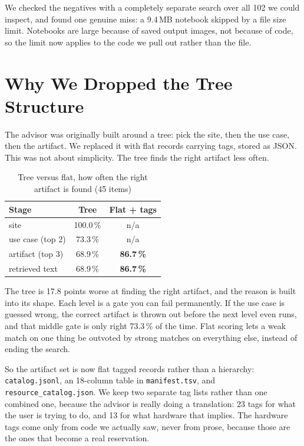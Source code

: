 \documentclass[conference]{IEEEtran}
\begin{document}
We checked the negatives with a completely separate search over all 102 we
could inspect, and found one genuine miss: a 9.4\,MB notebook skipped by a file
size limit. Notebooks are large because of saved output images, not because of
code, so the limit now applies to the code we pull out rather than the file.

\section{Why We Dropped the Tree Structure}

The advisor was originally built around a tree: pick the site, then the use
case, then the artifact. We replaced it with flat records carrying tags, stored
as JSON. This was not about simplicity. The tree finds the right artifact less
often.

\begin{table}[h]
\caption{Tree versus flat, how often the right artifact is found (45 items)}
\label{tab:a7}
\centering\footnotesize
\begin{tabular}{@{}lcc@{}}
\toprule
Stage & Tree & Flat + tags \\
\midrule
site               & 100.0\,\% & n/a \\
use case (top 2)   & 73.3\,\%  & n/a \\
artifact (top 3)   & 68.9\,\%  & \textbf{86.7\,\%} \\
retrieved text     & 68.9\,\%  & \textbf{86.7\,\%} \\
\bottomrule
\end{tabular}
\end{table}

The tree is 17.8 points worse at finding the right artifact, and the reason is
built into its shape. Each level is a gate you can fail permanently. If the use
case is guessed wrong, the correct artifact is thrown out before the next level
even runs, and that middle gate is only right 73.3\,\% of the time. Flat
scoring lets a weak match on one thing be outvoted by strong matches on
everything else, instead of ending the search.

So the artifact set is now flat tagged records rather than a hierarchy:
\texttt{catalog.jsonl}, an 18-column table in \texttt{manifest.tsv}, and
\texttt{resource\_catalog.json}. We keep two separate tag lists rather than one
combined one, because the advisor is really doing a translation: 23 tags for
what the user is trying to do, and 13 for what hardware that implies. The
hardware tags come only from code we actually saw, never from prose, because
those are the ones that become a real reservation.
\end{document}

